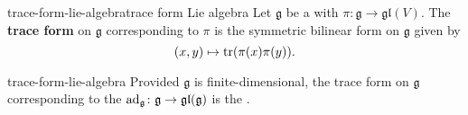 \begin{topic}{trace-form-lie-algebra}{trace form Lie algebra}
    Let $\mathfrak{g}$ be a  with  $\pi \colon \mathfrak{g} \to \mathfrak{gl}(V)$. The \textbf{trace form} on $\mathfrak{g}$ corresponding to $\pi$ is the symmetric bilinear form on $\mathfrak{g}$ given by
    \[ (x, y) \mapsto \operatorname{tr} (\pi(x) \pi(y)) . \]
\end{topic}

\begin{example}{trace-form-lie-algebra}
    Provided $\mathfrak{g}$ is finite-dimensional, the trace form on $\mathfrak{g}$ corresponding to the  $\textup{ad}_\mathfrak{g} \colon \mathfrak{g} \to \mathfrak{gl}(\mathfrak{g})$ is the .
\end{example}
